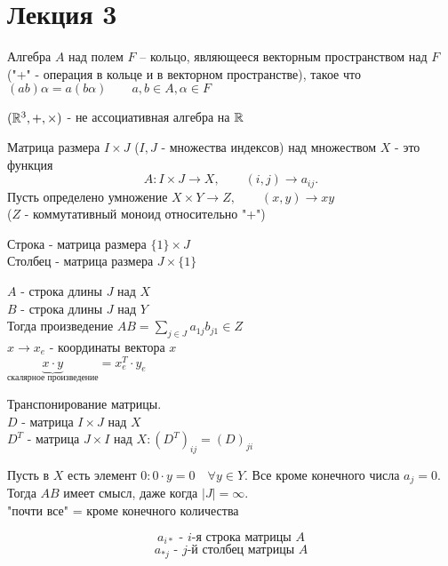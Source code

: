 \documentclass[12pt]{report}
\begin{document}
\section{Лекция 3}
\begin{defn}
    Алгебра $A$ над полем $F$ -- кольцо, являющееся векторным пространством над $F$ ("+" - операция в кольце и в векторном пространстве), такое что $(ab)\alpha = a(b\alpha) \qquad a, b \in A, \alpha \in F$
\end{defn}
\begin{ex}
    $(\mathbb{R}^3, +, \times)$ - не ассоциативная алгебра на $\mathbb{R}$
\end{ex}
\begin{defn}
    Матрица размера $I\times J$ ($I, J$ - множества индексов) над множеством $X$ - это функция \[
	A: I\times J \to X ,\qquad (i,j) \to a_{ij}
    .\] 
    Пусть определено умножение $X \times Y \to Z, \qquad  (x, y) \to xy$ \\($Z$ - коммутативный моноид относительно "+")
\end{defn}
\begin{defn}
    Строка - матрица размера $\{1\}\times J$\\
    Столбец - матрица размера $J \times \{1\}$
\end{defn}
\noindent$A$ - строка длины $J$ над $X$\\
$B$ - строка длины $J$ над $Y$\\
Тогда произведение $AB = \sum\limits_{j \in J} a_{1j} b_{j1} \in Z$\\
$x \to x_e$ - координаты вектора $x$\\
$\underbrace{x\cdot y}_{\mbox{скалярное произведение}} = x_e^T \cdot y_e$
\begin{defn}
    Транспонирование матрицы.\\
    $D$ - матрица $I \times J$ над $X$\\
    $D^T$ - матрица $J \times I$ над $X: (D^T)_{ij} = (D)_{ji}$
\end{defn}
\begin{note}
    Пусть в $X$ есть элемент $0 : 0\cdot y = 0 \quad \forall y \in Y$. Все кроме конечного числа $a_j = 0$. Тогда $AB$ имеет смысл, даже когда $|J| = \infty$.\\
    "почти все" = кроме конечного количества\\
\end{note}
\begin{name}
    $$a_{i*} \mbox{ - $i$-я строка матрицы }A$$
    $$a_{*j} \mbox{ - $j$-й столбец матрицы }A$$
\end{name}
\end{document}
